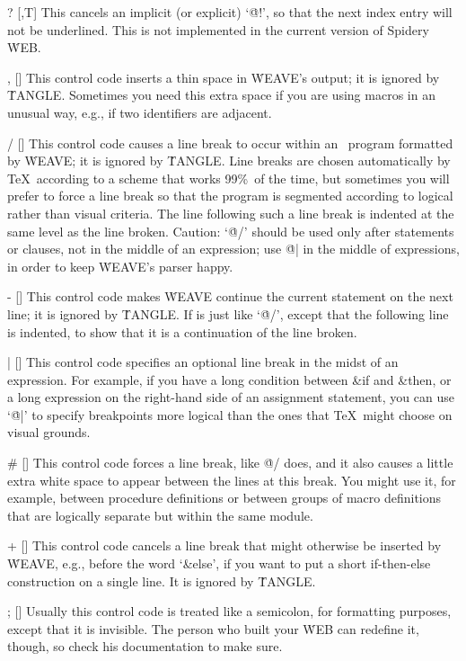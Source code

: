 \@?
[\PAS,T] This cancels an implicit (or explicit) `\.{@!}', so that the next
index entry will not be underlined.
\newstuff This is not implemented in the current version of Spidery \.{WEB}.
\endnewstuff

\@, [\PAS] This control code inserts a thin space in \.{WEAVE}'s output; it is
ignored by \.{TANGLE}.
Sometimes you need this extra space if you are using
macros in an unusual way, e.g., if two identifiers are adjacent.

\@/ [\PAS] This control code causes a line break to occur within an \PASCAL\
program formatted by \.{WEAVE}; it is ignored by \.{TANGLE}.
Line breaks
are chosen automatically by \TeX\ according to a scheme that works 99\%\
of the time, but sometimes you will prefer to force a line break so that
the program is segmented according to logical rather than visual criteria.
\newstuff
The line following such a line break is indented at the same level as
the line broken.
\endnewstuff
Caution: `\.{@/}' should be used only after statements or clauses, not in
the middle of an expression; use \.{@|} in the middle of expressions, in
order to keep \.{WEAVE}'s parser happy.

\@- [\PAS] \newstuff
This control code makes \.{WEAVE} continue the current
statement on the next line; it is ignored by \.{TANGLE}.
If is just like `\.{@/}', except that the following line is indented,
to show that it is a continuation of the line broken.
\endnewstuff

\@| [\PAS] This control code specifies an optional line break in the midst of
an expression.
For example, if you have a long condition between \&{if} and
\&{then}, or a long expression on the right-hand side of an assignment
statement, you can use `\.{@|}' to specify breakpoints more logical than
the ones that \TeX\ might choose on visual grounds.

\@\# [\PAS] This control code forces a line break, like \.{@/} does,
and it also causes a little extra white space to appear between the lines at
this break.
You might use it, for example, between procedure definitions or
between groups of macro definitions that are logically separate but within
the same module.

\@+ [\PAS] This control code cancels a line break that might otherwise be
inserted by \.{WEAVE}, e.g., before the word `\&{else}', if you want to
put a short if-then-else construction on a single line.
It is ignored by
\.{TANGLE}.

\@; [\PAS] Usually this control code is treated like a semicolon, for
formatting purposes, except that it is invisible.
\newstuff
The person who built your \.{WEB} can redefine it, though, so check
his documentation to make sure.
\endnewstuff

